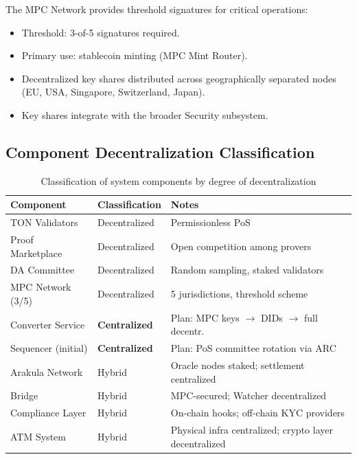 \documentclass[12pt,a4paper]{article}
\theoremstyle{definition}
\theoremstyle{remark}
\begin{document}
The MPC Network provides threshold signatures for critical operations:
\begin{itemize}[nosep]
    \item Threshold: 3-of-5 signatures required.
    \item Primary use: stablecoin minting (MPC Mint Router).
    \item Decentralized key shares distributed across geographically separated nodes (EU, USA, Singapore, Switzerland, Japan).
    \item Key shares integrate with the broader Security subsystem.
\end{itemize}

\subsection{Component Decentralization Classification}
\label{sec:decentralization-classification}

\begin{table}[H]
\centering
\small
\caption{Classification of system components by degree of decentralization}
\label{tab:component-classification}
\begin{tabular}{L{3.8cm}C{2.5cm}L{5.5cm}}
\toprule
\textbf{Component} & \textbf{Classification} & \textbf{Notes} \\
\midrule
TON Validators & Decentralized & Permissionless PoS \\
Proof Marketplace & Decentralized & Open competition among provers \\
DA Committee & Decentralized & Random sampling, staked validators \\
MPC Network (3/5) & Decentralized & 5 jurisdictions, threshold scheme \\
\midrule
Converter Service & \textbf{Centralized} & Plan: MPC keys $\to$ DIDs $\to$ full decentr. \\
Sequencer (initial) & \textbf{Centralized} & Plan: PoS committee rotation via ARC \\
\midrule
Arakula Network & Hybrid & Oracle nodes staked; settlement centralized \\
Bridge & Hybrid & MPC-secured; Watcher decentralized \\
Compliance Layer & Hybrid & On-chain hooks; off-chain KYC providers \\
ATM System & Hybrid & Physical infra centralized; crypto layer decentralized \\
\bottomrule
\end{tabular}
\end{table}
\end{document}

